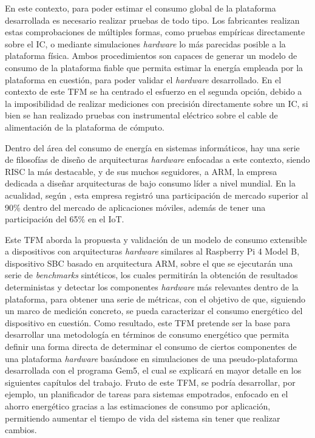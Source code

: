 En este contexto, para poder estimar el consumo global de la plataforma desarrollada es necesario realizar pruebas de todo tipo. Los fabricantes realizan estas comprobaciones de múltiples formas, como pruebas empíricas directamente sobre el \ac{IC}, o mediante simulaciones \textit{hardware} lo más parecidas posible a la plataforma física. Ambos procedimientos son capaces de generar un modelo de consumo de la plataforma fiable que permita estimar la energía empleada por la plataforma en cuestión, para poder validar el \textit{hardware} desarrollado. En el contexto de este \ac{TFM} se ha centrado el esfuerzo en el segunda opción, debido a la imposibilidad de realizar mediciones con precisión directamente sobre un \ac{IC}, si bien se han realizado pruebas con instrumental eléctrico sobre el cable de alimentación de la plataforma de cómputo.

Dentro del área del consumo de energía en sistemas informáticos, hay una serie de filosofías de diseño de arquitecturas \textit{hardware} enfocadas a este contexto, siendo \ac{RISC} la más destacable, y de sus muchos seguidores, a \ac{ARM}, la empresa dedicada a diseñar arquitecturas de bajo consumo líder a nivel mundial. En la acualidad, según \cite{mercadoArm}, esta empresa registró una participación de mercado superior al 90\% dentro del mercado de aplicaciones móviles, además de tener una participación del 65\% en el \ac{IoT}.

Este \ac{TFM} aborda la propuesta y validación de un modelo de consumo extensible a dispositivos con arquitecturas \textit{hardware} similares al Raspberry Pi 4 Model B, dispositivo \ac{SBC} basado en arquitectura \ac{ARM}, sobre el que se ejecutarán una serie de \textit{benchmarks} sintéticos, los cuales permitirán la obtención de resultados deterministas y detectar los componentes \textit{hardware} más relevantes dentro de la plataforma, para obtener una serie de métricas, con el objetivo de  que, siguiendo un marco de medición concreto, se pueda caracterizar el consumo energético del dispositivo en cuestión. Como resultado, este \ac{TFM} pretende ser la base para desarrollar una metodología en términos de consumo energético que permita definir una forma directa de determinar el consumo de ciertos componentes de una plataforma \textit{hardware} basándose en simulaciones de una pseudo-plataforma desarrollada con el programa Gem5, el cual se explicará en mayor detalle en los siguientes capítulos del trabajo. Fruto de este \ac{TFM}, se podría desarrollar, por ejemplo, un planificador de tareas para sistemas empotrados, enfocado en el ahorro energético gracias a las estimaciones de consumo por aplicación, permitiendo aumentar el tiempo de vida del sistema sin tener que realizar cambios. 

